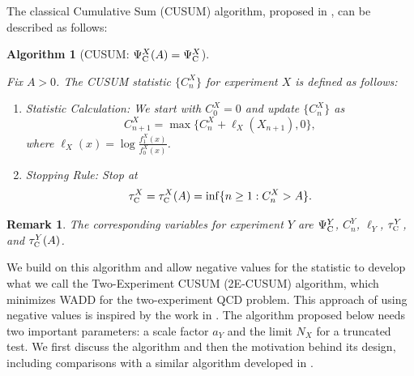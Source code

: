\documentclass[journal, onecolumn]{IEEEtran}
\newtheorem{remark}{Remark}
\newtheorem{algorithm}{Algorithm}
\begin{document}
The classical Cumulative Sum (CUSUM) algorithm, proposed in \cite{page1954}, can be described as follows:

\begin{algorithm}[CUSUM: $\Psi_{\textup{C}}^X (A) = \Psi_{\textup{C}}^X$]
\label{alg:cusum}

Fix $A > 0$. The \textup{CUSUM} statistic $\{ C_n^X \}$ for experiment $X$ is defined as follows:

\begin{enumerate}
\item Statistic Calculation: We start with $C_0^X = 0$ and update $\{ C_n^X \}$ as
$$ C_{n + 1}^X = \max \{ C_n^X + \ell_X (X_{n + 1}), 0 \}, $$
where $\ell_X (x) = \log \frac{f_1^X (x)}{f_0^X (x)}$.

\item Stopping Rule: Stop at
$$ \tau_{\textup{\fontsize{6 pt}{10 pt}\selectfont C}}^X =\tau_{\textup{\fontsize{6 pt}{10 pt}\selectfont C}}^X(A)= \inf \{ n \geq 1: C_n^X > A \}. $$
\end{enumerate}    
\end{algorithm}

\begin{remark}
\label{rem:CUSUM4Y}
The corresponding variables for experiment $Y$ are $\Psi_{\textup{C}}^Y$, $C_n^Y$, $\ell_Y$, $\tau_{\textup{\fontsize{6 pt}{10 pt}\selectfont C}}^Y$, and $\tau_{\textup{\fontsize{6 pt}{10 pt}\selectfont C}}^Y(A)$. 
\end{remark}

\medskip

We build on this algorithm and allow negative values for the statistic to develop what we call the Two-Experiment CUSUM (2E-CUSUM) algorithm, which minimizes WADD for the two-experiment QCD problem. This approach of using negative values is inspired by the work in \cite{banerjee2013}. The algorithm proposed below needs two important parameters: a scale factor $a_Y$ and the limit $N_X$ for a truncated test. We first discuss the algorithm and then the motivation behind its design, including comparisons with a similar algorithm developed in \cite{ren2017}.  
\end{document}
